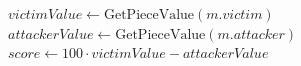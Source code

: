 \begin{algorithm2e}[tp]
\caption{MVV-LVA Capture Scoring}
\label{alg:mvv_lva}
\DontPrintSemicolon
{}
\BlankLine
$victimValue \leftarrow \text{GetPieceValue}(m.victim)$\;
$attackerValue \leftarrow \text{GetPieceValue}(m.attacker)$\;
\BlankLine
$score \leftarrow 100 \cdot victimValue - attackerValue$\;
\;
\end{algorithm2e}
